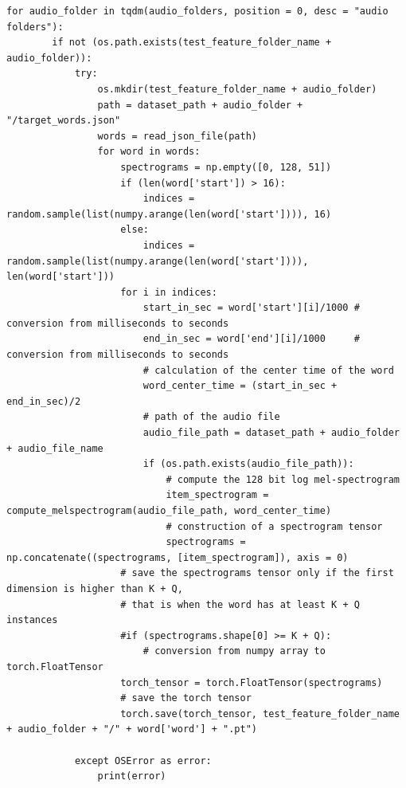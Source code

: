 \documentclass[12pt,a4paper,titlepage]{article}
\begin{document}
\begin{lstlisting}[language=iPython,firstnumber=10, caption=Funzione \texttt{save\_test\_dataset}, label=save_test_dataset,captionpos=b]
    for audio_folder in tqdm(audio_folders, position = 0, desc = "audio folders"):
        if not (os.path.exists(test_feature_folder_name + audio_folder)):
            try:
                os.mkdir(test_feature_folder_name + audio_folder)
                path = dataset_path + audio_folder + "/target_words.json"
                words = read_json_file(path)
                for word in words:
                    spectrograms = np.empty([0, 128, 51])
                    if (len(word['start']) > 16):
                        indices = random.sample(list(numpy.arange(len(word['start']))), 16)
                    else:
                        indices = random.sample(list(numpy.arange(len(word['start']))), len(word['start']))
                    for i in indices:
                        start_in_sec = word['start'][i]/1000 # conversion from milliseconds to seconds
                        end_in_sec = word['end'][i]/1000     # conversion from milliseconds to seconds
                        # calculation of the center time of the word
                        word_center_time = (start_in_sec + end_in_sec)/2
                        # path of the audio file
                        audio_file_path = dataset_path + audio_folder + audio_file_name
                        if (os.path.exists(audio_file_path)):
                            # compute the 128 bit log mel-spectrogram
                            item_spectrogram = compute_melspectrogram(audio_file_path, word_center_time)
                            # construction of a spectrogram tensor
                            spectrograms = np.concatenate((spectrograms, [item_spectrogram]), axis = 0)
                    # save the spectrograms tensor only if the first dimension is higher than K + Q, 
                    # that is when the word has at least K + Q instances
                    #if (spectrograms.shape[0] >= K + Q):
                        # conversion from numpy array to torch.FloatTensor
                    torch_tensor = torch.FloatTensor(spectrograms)
                    # save the torch tensor
                    torch.save(torch_tensor, test_feature_folder_name + audio_folder + "/" + word['word'] + ".pt")
                
            except OSError as error:
                print(error)   
\end{lstlisting}
\clearpage
\end{document}
